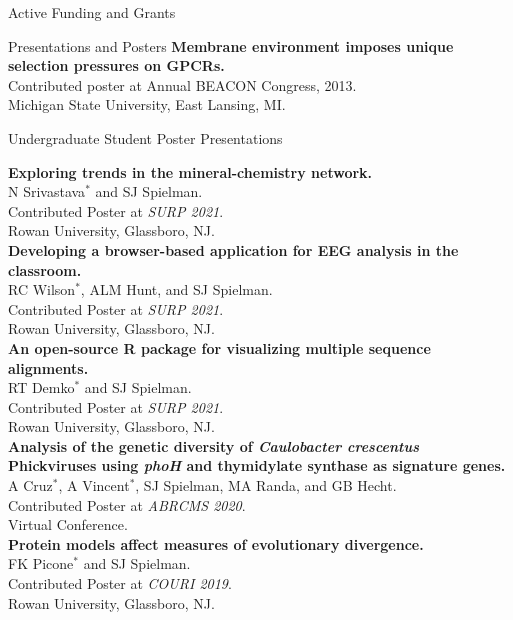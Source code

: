 \documentclass{resume} %
\begin{document}
\begin{rSection}{Active Funding and Grants}
\begin{rSection}{Presentations and Posters}
\textbf{Membrane environment imposes unique selection pressures on GPCRs.}
\\Contributed poster at Annual BEACON Congress, 2013.
\\ Michigan State University, East Lansing, MI.


\end{rSection}


\vspace*{0.5cm} 
\begin{rSection}{Undergraduate Student Poster Presentations}
\vspace*{0.25cm}


\textbf{Exploring trends in the mineral-chemistry network.}
\\ N Srivastava$^\ast$ and SJ Spielman.
\\ Contributed Poster at \emph{SURP 2021}.
\\ Rowan University, Glassboro, NJ.\\

\textbf{Developing a browser-based application for EEG analysis in the classroom.}
\\ RC Wilson$^\ast$, ALM Hunt, and SJ Spielman.
\\ Contributed Poster at \emph{SURP 2021}.
\\ Rowan University, Glassboro, NJ.\\

\textbf{An open-source R package for visualizing multiple sequence alignments.}
\\ RT Demko$^\ast$ and SJ Spielman.
\\ Contributed Poster at \emph{SURP 2021}.
\\ Rowan University, Glassboro, NJ.\\


\textbf{Analysis of the genetic diversity of \emph{Caulobacter crescentus} Phickviruses using \emph{phoH} and thymidylate synthase as signature genes.}
\\ A Cruz$^\ast$, A Vincent$^\ast$, SJ Spielman, MA Randa, and GB Hecht.
\\ Contributed Poster at \emph{ABRCMS 2020}.
\\ Virtual Conference.\\

\textbf{Protein models affect measures of evolutionary divergence.}
\\ FK Picone$^\ast$ and SJ Spielman.
\\ Contributed Poster at \emph{COURI 2019}.
\\ Rowan University, Glassboro, NJ.\\


\end{rSection}
\end{rSection}
\end{document}
